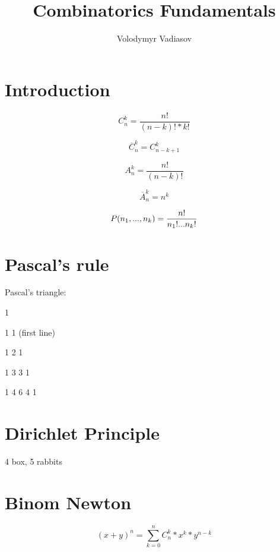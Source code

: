 \documentclass{exam}
\author{Volodymyr Vadiasov}
\title{Combinatorics Fundamentals}
\theoremstyle{definition}
\begin{document}
    \maketitle

    \section{Introduction}\label{sec:introduction}

    \begin{equation}
        C^k_{n} = \frac{n!}{(n-k)!* k!}
    \end{equation}

    \begin{equation}
        \overline{C}^k_{n} = C^k_{n-k+1}
    \end{equation}

    \begin{equation}
        A^k_{n} = \frac{n!}{(n-k)!}
    \end{equation}

    \begin{equation}
        \overline{A}^k_{n} = n^k
    \end{equation}

    \begin{equation}
        P(n_1, ..., n_k)= \frac{n!}{n_1! \text... n_k!}
    \end{equation}

    \section{Pascal's rule} \label{sec:Pascal's rule}
    Pascal's triangle:

    1

    1 1  (first line)

    1 2 1

    1 3 3 1

    1 4 6 4 1

    \section{Dirichlet Principle} \label{sec:Dirichlet Principle}
    4 box, 5 rabbits

    \section{Binom Newton} \label{sec:Binom Newton}
    \begin{equation}
        (x+y)^n = \sum_{k=0}^n C^k_n * x^k * y^{n-k}
    \end{equation}
\end{document}
